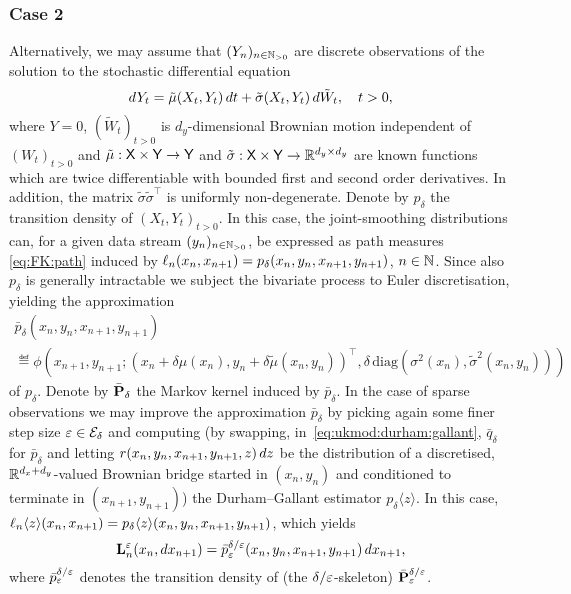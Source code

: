 \begin{example}
\subsubsection*{Case 2} Alternatively, we may assume that $(Y_n)_{n \in \mathbb{N}_{> 0}}$ are discrete observations of the solution to the stochastic differential equation 
$$
d Y_t = \tilde{\mu}(X_t, Y_t) \, d t + \tilde{\sigma}(X_t, Y_t) \, d \tilde{W}_t, \quad t > 0, 
$$
where $Y = 0$, $(\tilde{W}_t)_{t > 0}$ is $d_y$-dimensional Brownian motion independent of $(W_t)_{t > 0}$ and $\tilde{\mu} : \mathsf{X} \times \mathsf{Y} \to \mathsf{Y}$ and $\tilde{\sigma} : \mathsf{X} \times \mathsf{Y} \to \mathbb{R}^{d_y \times d_y}$ are known functions which are twice differentiable with bounded first and second order derivatives. In addition, the matrix $\tilde{\sigma} \tilde{\sigma}^\intercal$ is uniformly non-degenerate. Denote by $p_\delta$ the transition density of $(X_t, Y_t)_{t > 0}$. In this case, the joint-smoothing distributions can, for a given data stream $(y_n)_{n \in \mathbb{N}_{> 0}}$, be expressed as path measures \eqref{eq:FK:path} induced by $\ell_{n}(x_n, x_{n + 1}) = p_\delta(x_n, y_n, x_{n + 1}, y_{n + 1})$, $n \in \mathbb{N}$. Since also $p_\delta$ is generally intractable we subject the bivariate process to Euler discretisation, yielding the approximation 
\begin{multline}
\bar{p}_\delta(x_n, y_n, x_{n + 1}, y_{n + 1}) \\
\eqdef \phi \left( x_{n + 1}, y_{n + 1}; (x_n + \delta \mu(x_n), y_n + \delta \tilde{\mu}(x_n, y_n))^\intercal, \delta \, \mbox{diag}(\sigma^2(x_n), \tilde{\sigma}^2(x_n, y_n)) \right) \label{eq:td:bivariate:process}
\end{multline}
of $p_\delta$. Denote by $\bar{\mathbf{P}}_\delta$ the Markov kernel induced by $\bar{p}_\delta$. In the case of sparse observations we may improve the approximation $\bar{p}_\delta$ by picking again some finer step size $\varepsilon \in \mathcal{E}_\delta$ and computing (by swapping, in~\eqref{eq:ukmod:durham:gallant}, $\bar{q}_\delta$ for $\bar{p}_\delta$ and letting $r(x_n, y_n, x_{n + 1}, y_{n + 1}, z) \, d z$ be the distribution of a discretised, $\mathbb{R}^{d_x + d_y}$-valued Brownian bridge started in $(x_n, y_n)$ and conditioned to terminate in $(x_{n + 1}, y_{n + 1})$) the Durham--Gallant estimator $p_\delta \langle z \rangle$. In this case, $\ell_{n} \langle z \rangle(x_n, x_{n + 1}) = p_\delta \langle z \rangle (x_n, y_n, x_{n + 1}, y_{n + 1})$, which yields
\begin{equation} \label{eq:ukmod:durham:gallant:case:2}
\ukmod{n}(x_n, \rmd x_{n + 1}) = \bar{p}_\precpar^{\delta / \precpar}(x_n, y_n, x_{n + 1}, y_{n + 1}) \, \rmd x_{n + 1}, 
\end{equation}
where $\bar{p}_\varepsilon^{\delta / \varepsilon}$ denotes the transition density of (the $\delta / \varepsilon$-skeleton) $\bar{\mathbf{P}}_\varepsilon^{\delta / \varepsilon}$.  
\end{example}

